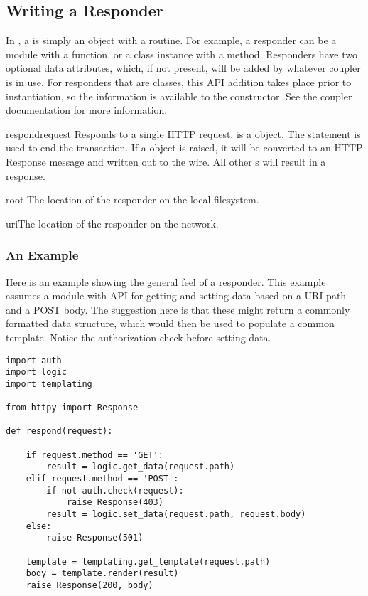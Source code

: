 \subsection{Writing a Responder \label{writing-a-responder}}

In , a  is simply an object with a
 routine. For example, a responder can be a module with a
 function, or a class instance with a  method.
Responders have two optional data attributes, which, if not present, will be
added by whatever coupler is in use. For responders that are classes, this API
addition takes place prior to instantiation, so the information is available to
the constructor. See the coupler documentation for more information.


\begin{funcdesc}{respond}{request} Responds to a single HTTP request.
 is a  object. The  statement is used to
end the transaction. If a  object is raised, it will be
converted to an HTTP Response message and written out to the wire. All other
s will result in a 
response.\end{funcdesc}

\begin{datadesc}{root} The location of the responder on the local
filesystem.\end{datadesc}

\begin{datadesc}{uri}The location of the responder on the network.\end{datadesc}




\subsubsection{An Example}

Here is an example showing the general feel of a responder. This example assumes
a  module with API for getting and setting data based on a URI path
and a POST body. The suggestion here is that these might return a commonly
formatted data structure, which would then be used to populate a common
template. Notice the authorization check before setting data.

\begin{verbatim}
import auth
import logic
import templating

from httpy import Response

def respond(request):

    if request.method == 'GET':
        result = logic.get_data(request.path)
    elif request.method == 'POST':
        if not auth.check(request):
            raise Response(403)
        result = logic.set_data(request.path, request.body)
    else:
        raise Response(501)

    template = templating.get_template(request.path)
    body = template.render(result)
    raise Response(200, body)

\end{verbatim}


